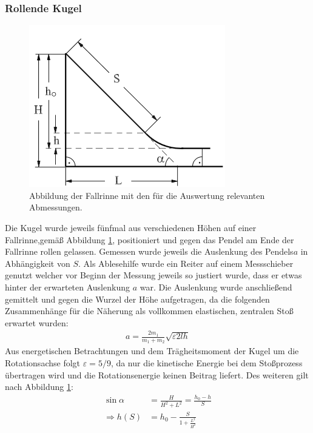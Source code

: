 \subsubsection*{Rollende Kugel}

\begin{figure}[h]
	\centering
	\includegraphics[width=0.7\linewidth]{res/FallrinneSkizze}
	\caption{Abbildung der Fallrinne mit den für die Auswertung relevanten Abmessungen\cite{anleitung-ws2017}.}
	\label{fig:rinneskizze}
\end{figure}

Die Kugel wurde jeweils fünfmal aus verschiedenen Höhen auf einer Fallrinne,gemäß Abbildung \ref{fig:rinneskizze}, positioniert und gegen das Pendel am Ende der Fallrinne rollen gelassen. Gemessen wurde jeweils die Auslenkung des Pendels$a$ in Abhängigkeit von $S$. Als Ablesehilfe wurde ein Reiter auf einem Messschieber genutzt welcher vor Beginn der Messung jeweils so justiert wurde, dass er etwas hinter der erwarteten Auslenkung $a$ war.
Die Auslenkung wurde anschließend gemittelt und gegen die Wurzel der Höhe aufgetragen, da die folgenden Zusammenhänge für die Näherung als vollkommen elastischen, zentralen Stoß erwartet wurden:
\begin{align}
a=\frac{2m_1}{m_1+m_2}\sqrt{\varepsilon 2 l h}
\end{align}
Aus energetischen Betrachtungen und dem Trägheitsmoment der Kugel um die Rotationsachse folgt $\varepsilon= 5/9$, da nur die kinetische Energie  bei dem Stoßprozess übertragen wird und die Rotationsenergie keinen Beitrag liefert.
Des weiteren gilt nach Abbildung \ref{fig:rinneskizze}:
\begin{align}
\sin \alpha &=\frac{H}{H^2+L^2}=\frac{h_0-h}{S} \\
\Rightarrow  h(S) &= h_0-\frac{S}{1+\frac{L^2}{H^2}}
\end{align}













